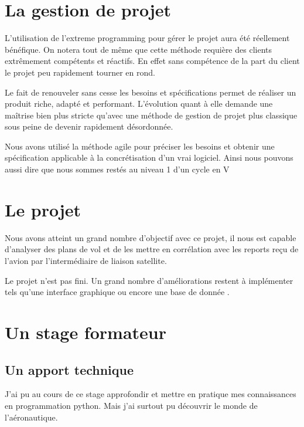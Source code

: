 
\section{La gestion de projet}
L'utilisation de l'extreme programming pour gérer le projet aura été réellement bénéfique. On notera tout de même que cette méthode requière des clients extrêmement compétents et réactifs. En effet sans compétence de la part du client le projet peu rapidement tourner en rond.

Le fait de renouveler sans cesse les besoins et spécifications permet de réaliser un produit riche, adapté et performant. L'évolution quant à elle demande une maîtrise bien plus stricte qu'avec une méthode de gestion de projet plus classique sous peine de devenir rapidement désordonnée.

Nous avons utilisé la méthode agile pour préciser les besoins et obtenir une spécification applicable à la concrétisation d'un vrai logiciel. Ainsi nous pouvons aussi dire que nous sommes restés au niveau 1 d'un cycle en V

\section{Le projet}
Nous avons atteint un grand nombre d'objectif avec ce projet, il nous est capable d'analyser des plans de vol et de les mettre en corrélation avec les reports reçu de l'avion par l'intermédiaire de liaison satellite.

Le projet n'est pas fini. Un grand nombre d'améliorations restent à implémenter tels qu'une interface graphique ou encore une base de donnée .

\section{Un stage formateur}
    \subsection{Un apport technique}
J'ai pu au cours de ce stage approfondir et mettre en pratique mes connaissances en programmation python. Mais j'ai surtout pu découvrir le monde de l'aéronautique. 

